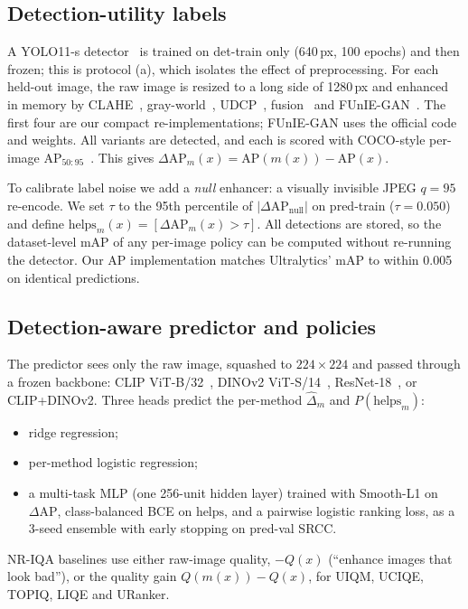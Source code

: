 \documentclass[conference]{IEEEtran}
\newcommand{\dap}{\Delta\mathrm{AP}}
\begin{document}
\subsection{Detection-utility labels}
A YOLO11-s detector~\cite{jocher2023ultralytics} is trained on det-train only (640\,px, 100 epochs) and then frozen; this is protocol (a), which isolates the effect of preprocessing. For each held-out image, the raw image is resized to a long side of 1280\,px and enhanced in memory by CLAHE~\cite{zuiderveld1994clahe}, gray-world~\cite{buchsbaum1980grayworld}, UDCP~\cite{drews2013udcp}, fusion~\cite{ancuti2018fusion} and FUnIE-GAN~\cite{islam2020funie}. The first four are our compact re-implementations; FUnIE-GAN uses the official code and weights. All variants are detected, and each is scored with COCO-style per-image AP$_{50:95}$~\cite{lin2014coco}. This gives $\dap_m(x)=\mathrm{AP}(m(x))-\mathrm{AP}(x)$.

To calibrate label noise we add a \emph{null} enhancer: a visually invisible JPEG $q{=}95$ re-encode. We set $\tau$ to the 95th percentile of $|\dap_{\text{null}}|$ on pred-train ($\tau=0.050$) and define $\text{helps}_m(x)=[\dap_m(x)>\tau]$. All detections are stored, so the dataset-level mAP of any per-image policy can be computed without re-running the detector. Our AP implementation matches Ultralytics' mAP to within 0.005 on identical predictions.

\subsection{Detection-aware predictor and policies}
The predictor sees only the raw image, squashed to $224\times224$ and passed through a frozen backbone: CLIP ViT-B/32~\cite{radford2021clip}, DINOv2 ViT-S/14~\cite{oquab2024dinov2}, ResNet-18~\cite{he2016resnet}, or CLIP+DINOv2. Three heads predict the per-method $\hat{\Delta}_m$ and $P(\text{helps}_m)$:
\begin{itemize}
\item ridge regression;
\item per-method logistic regression;
\item a multi-task MLP (one 256-unit hidden layer) trained with Smooth-L1 on $\dap$, class-balanced BCE on $\text{helps}$, and a pairwise logistic ranking loss, as a 3-seed ensemble with early stopping on pred-val SRCC.
\end{itemize}
NR-IQA baselines use either raw-image quality, $-Q(x)$ (``enhance images that look bad''), or the quality gain $Q(m(x))-Q(x)$, for UIQM, UCIQE, TOPIQ, LIQE and URanker.
\end{document}
